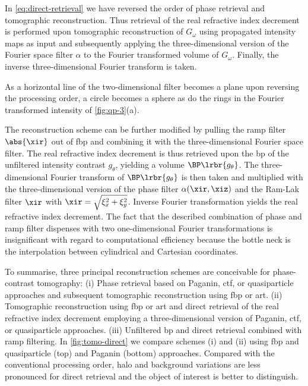 \documentclass[
twoside,
openright,
titlepage,
numbers=noenddot,
headinclude,
fleqn,
a4paper,
footinclude=true,
cleardoublepage=empty,
abstractoff,
BCOR=5mm,
paper=a4,
fontsize=11pt,
british,ngerman,american,
]{scrreprt}
\begin{document}
In \cref{eq:direct-retrieval} we have reversed the order of phase
retrieval and tomographic reconstruction.  Thus retrieval of the real
refractive index decrement is performed upon tomographic
reconstruction of $G_\omega$ using propagated intensity maps as input
and subsequently applying the three-dimensional version of the Fourier
space filter $\alpha$ to the Fourier transformed volume of $G_\omega$.
Finally, the inverse three-dimensional Fourier transform is taken.

As a horizontal line of the two-dimensional filter becomes a plane
upon reversing the processing order, a circle becomes a sphere as do
the rings in the Fourier transformed intensity of \cref{fig:qp-3}(a).

The reconstruction scheme can be further modified by pulling the ramp
filter $\abs{\xir}$ out of \ac{fbp} and combining it with the
three-dimensional Fourier space filter.  The real refractive index
decrement is thus retrieved upon the \acf{bp} of the unfiltered
intensity contrast $g_\theta$, yielding a volume
$\BP\lrbr{g_\theta}$.  The three-dimensional Fourier transform of
$\BP\lrbr{g_\theta}$ is then taken and multiplied with the
three-dimensional version of the phase filter $\alpha(\xir,\xiz)$
and the Ram-Lak filter $\xir$ with $\xir=\sqrt{\xi_x^2+\xi_y^2}$.
Inverse Fourier transformation yields the real refractive index
decrement.  The fact that the described combination of phase and ramp
filter dispenses with two one-dimensional Fourier transformations is
insignificant with regard to computational efficiency because the
 bottle neck is the interpolation between cylindrical and
Cartesian coordinates.

To summarise, three principal reconstruction schemes are conceivable
for phase-contrast tomography: (i) Phase retrieval based on Paganin,
\ac{ctf}, or quasiparticle approaches and subsequent tomographic
reconstruction using \ac{fbp} or \ac{art}.  (ii) Tomographic
reconstruction using \ac{fbp} or \ac{art} and direct retrieval of the
real refractive index decrement employing a three-dimensional version
of Paganin, \ac{ctf}, or quasiparticle approaches.  (iii) Unfiltered
\acf{bp} and direct retrieval combined with ramp filtering.  In
\cref{fig:tomo-direct} we compare schemes (i) and (ii) using \ac{fbp}
and quasiparticle (top) and Paganin (bottom) approaches.  Compared
with the conventional processing order, halo and background variations
are less pronounced for direct retrieval and the object of interest is
better to distinguish.
\end{document}
